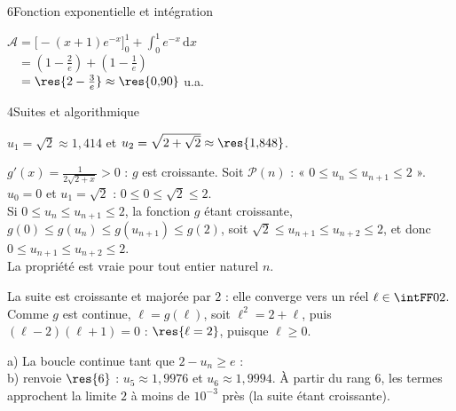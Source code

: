 \begin{corrigeBac}{6}{Fonction exponentielle et intégration}
\begin{questions}[resume]
\begin{codecote}[0.56]
\raggedright
$\mathcal{A}=\Big[-(x+1)e^{-x}\Big]_0^1+\int_0^1e^{-x}\,\mathrm{d}x$\\[1mm]
$\phantom{\mathcal{A}}=\left(1-\frac2e\right)+\left(1-\frac1e\right)$\\[1mm]
$\phantom{\mathcal{A}}=\res{2-\tfrac3e}\approx\res{0{,}90}$ u.a.
\cote
\centering
{}
\end{codecote}
    \pts{1 pt}
\end{questions}
\end{corrigeBac}

\begin{corrigeBac}{4}{Suites et algorithmique}
\begin{questions}
  \item $u_1=\sqrt2\approx1{,}414$ et $u_2=\sqrt{2+\sqrt2}\approx\res{1{,}848}$. 
  \item $g'(x)=\frac{1}{2\sqrt{2+x}}>0$ : $g$ est croissante. Soit $\mathcal{P}(n)$ : « $0\leq u_n\leq u_{n+1}\leq2$ ».\\
     $u_0=0$ et $u_1=\sqrt2$ : $0\leq0\leq\sqrt2\leq2$.\\
     Si $0\leq u_n\leq u_{n+1}\leq2$, la fonction $g$ étant croissante, $g(0)\leq g(u_n)\leq g(u_{n+1})\leq g(2)$, soit
    $\sqrt2\leq u_{n+1}\leq u_{n+2}\leq2$, et donc $0\leq u_{n+1}\leq u_{n+2}\leq2$.\\
     La propriété est vraie pour tout entier naturel $n$. 
  \item La suite est croissante et majorée par $2$ : elle converge vers un réel $\ell\in\intFF02$. Comme $g$ est continue, $\ell=g(\ell)$,
    soit $\ell^2=2+\ell$, puis $(\ell-2)(\ell+1)=0$ : $\res{\ell=2}$, puisque $\ell\geq0$. \pts{1 pt}
  \item a) La boucle continue tant que $2-u_n\geq e$ : \\
    b)  renvoie $\res{6}$ : $u_5\approx1{,}9976$ et $u_6\approx1{,}9994$. À partir du rang $6$, les termes approchent la
    limite $2$ à moins de $10^{-3}$ près (la suite étant croissante). \pts{1 pt}
\end{questions}
\end{corrigeBac}
